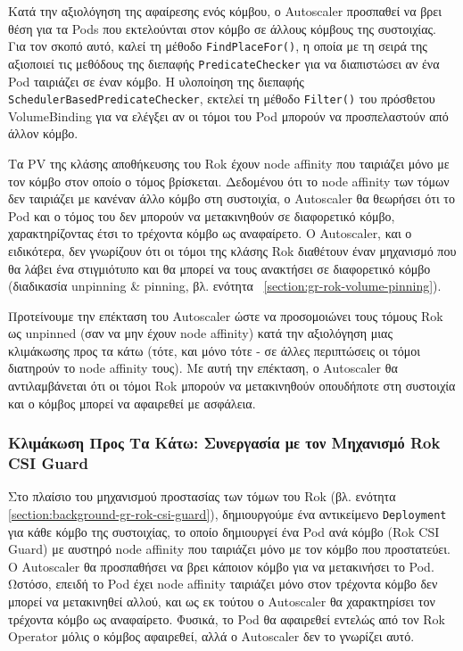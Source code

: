 Κατά την αξιολόγηση της αφαίρεσης ενός κόμβου, ο Autoscaler προσπαθεί να βρει θέση για
τα Pods που εκτελούνται στον κόμβο σε άλλους κόμβους της συστοιχίας. Για τον
σκοπό αυτό, καλεί τη μέθοδο \texttt{FindPlaceFor()}, η οποία με τη σειρά της
αξιοποιεί τις μεθόδους της διεπαφής \texttt{PredicateChecker} για να διαπιστώσει
αν ένα Pod ταιριάζει σε έναν κόμβο. Η υλοποίηση της διεπαφής
\texttt{SchedulerBasedPredicateChecker}, εκτελεί τη μέθοδο \texttt{Filter()} του
πρόσθετου VolumeBinding για να ελέγξει αν οι τόμοι του Pod μπορούν να
προσπελαστούν από άλλον κόμβο.

Τα PV της κλάσης αποθήκευσης του Rok  έχουν node affinity  που ταιριάζει μόνο με
τον κόμβο στον οποίο ο τόμος βρίσκεται. Δεδομένου ότι το node affinity των τόμων
δεν ταιριάζει με κανέναν άλλο κόμβο στη συστοιχία, ο Autoscaler θα θεωρήσει ότι το Pod
και ο τόμος του δεν μπορούν να μετακινηθούν σε διαφορετικό κόμβο,
χαρακτηρίζοντας έτσι το τρέχοντα κόμβο ως αναφαίρετο. Ο Autoscaler, και ο
 ειδικότερα, δεν γνωρίζουν ότι οι τόμοι της
κλάσης Rok διαθέτουν έναν μηχανισμό που θα λάβει ένα στιγμιότυπο και θα μπορεί
να τους ανακτήσει σε διαφορετικό κόμβο (διαδικασία unpinning \& pinning, βλ.
ενότητα ~\ref{section:gr-rok-volume-pinning}).

Προτείνουμε την επέκταση του Autoscaler ώστε να προσομοιώνει τους τόμους Rok ως unpinned
(σαν να μην έχουν node affinity) κατά την αξιολόγηση μιας κλιμάκωσης προς τα
κάτω (τότε, και μόνο τότε - σε άλλες περιπτώσεις οι τόμοι διατηρούν το node
affinity τους). Με αυτή την επέκταση, ο Autoscaler θα αντιλαμβάνεται ότι οι τόμοι Rok
μπορούν να μετακινηθούν οπουδήποτε στη συστοιχία και ο κόμβος μπορεί να
αφαιρεθεί με ασφάλεια.

\subsubsection{Κλιμάκωση Προς Τα Κάτω: Συνεργασία με τον Μηχανισμό Rok CSI Guard}

Στο πλαίσιο του μηχανισμού προστασίας των τόμων του Rok (βλ. ενότητα
\ref{section:background-gr-rok-csi-guard}), δημιουργούμε ένα αντικείμενο
\texttt{Deployment} για κάθε κόμβο της συστοιχίας, το οποίο δημιουργεί ένα Pod
ανά κόμβο (Rok CSI Guard) με αυστηρό node affinity που ταιριάζει μόνο με τον
κόμβο που προστατεύει. Ο Autoscaler θα προσπαθήσει να βρει κάποιον κόμβο για να
μετακινήσει το Pod. Ωστόσο, επειδή το Pod έχει  node affinity ταιριάζει μόνο
στον τρέχοντα κόμβο δεν μπορεί να μετακινηθεί αλλού, και ως εκ τούτου ο Autoscaler θα
χαρακτηρίσει τον τρέχοντα κόμβο ως αναφαίρετο. Φυσικά, το Pod θα αφαιρεθεί
εντελώς από τον Rok Operator μόλις ο κόμβος αφαιρεθεί, αλλά ο Autoscaler δεν το γνωρίζει
αυτό.

